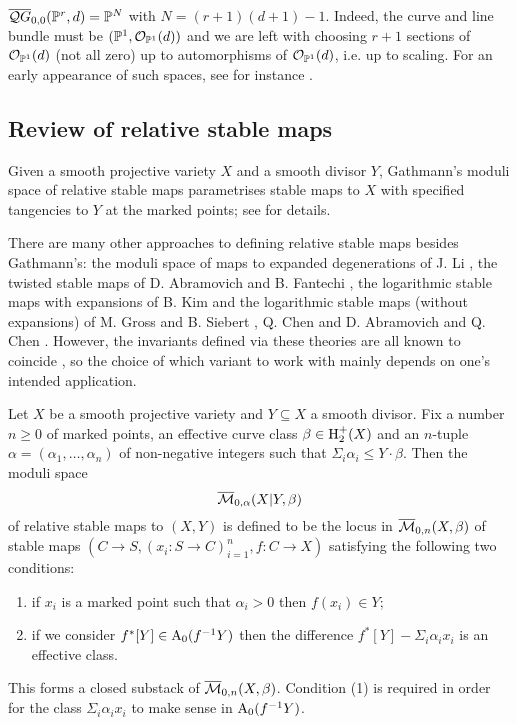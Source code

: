 \begin{example} $\overline{\mathcal QG}_{0,0}(\mathbb P^r,d) = \mathbb P^N$ with $N=(r+1)(d+1)-1$. Indeed, the curve and line bundle must be $(\mathbb P^1,\mathcal O_{\mathbb P^1}(d))$ and we are left with choosing $r+1$ sections of $\mathcal O_{\mathbb P^1}(d)$ (not all zero) up to automorphisms of $\mathcal O_{\mathbb P^1}(d)$, i.e. up to scaling. For an early appearance of such spaces, see for instance \cite{Bertram}.\end{example}

\subsection{Review of relative stable maps} \label{Subsection relative stable maps} Given a smooth projective variety $X$ and a smooth divisor $Y$, Gathmann's moduli space of relative stable maps parametrises stable maps to $X$ with specified tangencies to $Y$ at the marked points; see \cite{Ga} for details.

\begin{remark} There are many other approaches to defining relative stable maps besides Gathmann's: the moduli space of maps to expanded degenerations of J. Li \cite{Li1} \cite{Li2}, the twisted stable maps of D. Abramovich and B. Fantechi \cite{AbramovichFantechi}, the logarithmic stable maps with expansions of B. Kim \cite{KimLog} and the logarithmic stable maps (without expansions) of M. Gross and B. Siebert \cite{GrossSiebertLog} \cite{GrossSiebertIntrinsic}, Q. Chen \cite{ChenLog} and D. Abramovich and Q. Chen \cite{AbramovichChenLog}. However, the invariants defined via these theories are all known to coincide \cite{AbramovichMarcusWiseComparison}, so the choice of which variant to work with mainly depends on one's intended application. \end{remark}

\begin{definition}[{\cite[Definition 1.1]{Ga}}] Let $X$ be a smooth projective variety and $Y \subseteq X$ a smooth divisor. Fix a number $n \geq 0$ of marked points, an effective curve class $\beta \in \operatorname{H}_2^+(X)$ and an $n$-tuple $\alpha = (\alpha_1, \ldots, \alpha_n)$ of non-negative integers such that $\Sigma_i \alpha_i \leq Y \cdot \beta$. Then the moduli space
\begin{equation*} \overline{\mathcal M}_{0,\alpha}(X|Y,\beta) \end{equation*}
of relative stable maps to $(X,Y)$ is defined to be the locus in $\overline{\mathcal M}_{0,n}(X,\beta)$ of stable maps $(C \to S , (x_i : S \to C)_{i=1}^n , f : C \to X)$ satisfying the following two conditions:
\begin{enumerate}
\item if $x_i$ is a marked point such that $\alpha_i > 0$ then $f(x_i) \in Y$;
\item if we consider $f^* [Y] \in \operatorname{A}_0(f^{-1}Y)$ then the difference $f^* [Y] - \Sigma_i \alpha_i x_i$ is an effective class.
\end{enumerate}
This forms a closed substack of $\overline{\mathcal M}_{0,n}(X,\beta)$. Condition (1) is required in order for the class $\Sigma_i \alpha_i x_i$ to make sense in $\operatorname{A}_0(f^{-1}Y)$.
\end{definition}

